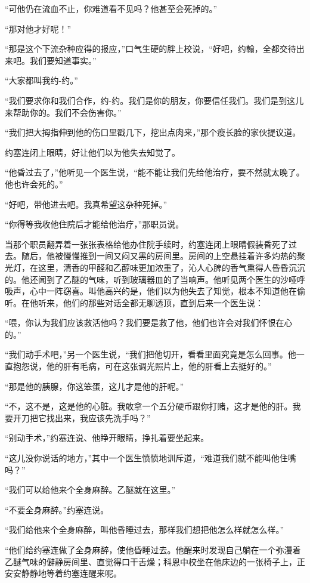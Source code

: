     “可他仍在流血不止，你难道看不见吗？他甚至会死掉的。”

    “那对他才好呢！”

    “那是这个下流杂种应得的报应，”口气生硬的胖上校说，“好吧，约翰，全都交待出来吧。我们要知道事实。”

    “大家都叫我约-约。”

    “我们要求你和我们合作，约-约。我们是你的朋友，你要信任我们。我们是到这儿来帮助你的。我们不会伤害你。”

    “我们把大拇指伸到他的伤口里戳几下，挖出点肉来，”那个瘦长脸的家伙提议道。

    约塞连闭上眼睛，好让他们以为他失去知觉了。

    “他昏过去了，”他听见一个医生说，“能不能让我们先给他治疗，要不然就太晚了。他也许会死的。”

    “好吧，带他进去吧。我真希望这杂种死掉。”

    “你得等我收他住院后才能给他治疗，”那职员说。

    当那个职员翻弄着一张张表格给他办住院手续时，约塞连闭上眼睛假装昏死了过去。随后，他被慢慢推到一间又闷又黑的房间里。房间的上空悬挂着许多灼热的聚光灯，在这里，清香的甲醛和乙醇味更加浓重了，沁人心脾的香气熏得人昏昏沉沉的。他还闻到了乙醚的气味，听到玻璃器皿的了当响声。他听见两个医生的沙哑呼吸声，心中一阵窃喜。叫他高兴的是，他们以为他失去了知觉，根本不知道他在偷听。在他听来，他们的那些对话全都无聊透顶，直到后来一个医生说：

    “喂，你认为我们应该救活他吗？我们要是救了他，他们也许会对我们怀恨在心的。”

    “我们动手术吧，”另一个医生说，“我们把他切开，看看里面究竟是怎么回事。他一直抱怨说，他的肝有毛病，可在这张调光照片上，他的肝看上去挺好的。”

    “那是他的胰腺，你这笨蛋，这儿才是他的肝呢。”

    “不，这不是，这是他的心脏。我敢拿一个五分硬币跟你打赌，这才是他的肝。我要开刀把它找出来，我应该先洗手吗？”

    “别动手术，”约塞连说、他睁开眼睛，挣扎着要坐起来。

    “这儿没你说话的地方，”其中一个医生愤愤地训斥道，“难道我们就不能叫他住嘴吗？”

    “我们可以给他来个全身麻醉。乙醚就在这里。”

    “不要全身麻醉。”约塞连说。

    “我们给他来个全身麻醉，叫他昏睡过去，那样我们想把他怎么样就怎么样。”

    “他们给约塞连做了全身麻醉，使他昏睡过去。他醒来时发现自己躺在一个弥漫着乙醚气味的僻静房间里、直觉得口干舌燥；科恩中校坐在他床边的一张椅子上，正安安静静地等着约塞连醒来呢。

